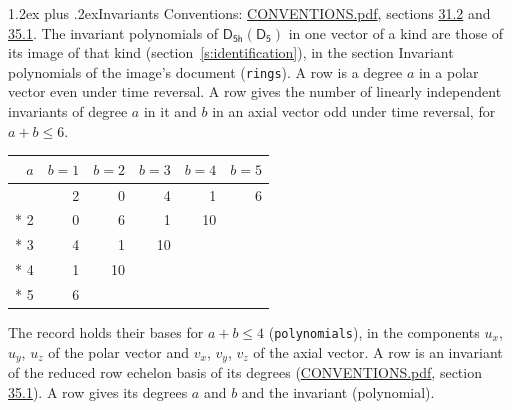 \documentclass[10pt,a4paper]{article}
\makeatletter
\renewcommand\section{\@startsection{section}{1}{\z@}{-3ex plus -1ex minus -.2ex}%
  {1.2ex plus .2ex}{\normalfont\large\sffamily\bfseries\color{parttitle}}}
\numberwithin{equation}{section}
\newcommand{\grp}[1]{\mathsf{#1}}
\makeatother
\begin{document}
\section{Invariants}\label{s:invariants}
Conventions: \href{../../CONVENTIONS.pdf}{CONVENTIONS.pdf}, sections \href{../../CONVENTIONS.pdf\#conv.31.2}{31.2} and \href{../../CONVENTIONS.pdf\#conv.35.1}{35.1}.
The invariant polynomials of $\grp{D_{5h}}(\grp{D_{5}})$ in one vector of a kind are those of its image of that kind (section~\ref{s:identification}), in the section Invariant polynomials of the image's document (\texttt{rings}).
\leavevmode\label{n:index.degree.polar}\label{n:index.degree.axial}A row is a degree $a$ in a polar vector even under time reversal. A row gives the number of linearly independent invariants of degree $a$ in it and $b$ in an axial vector odd under time reversal, for $a + b \le 6$.
{\small\begin{longtable}{@{}rrrrrr@{}}\toprule
$a$ & $b = 1$ & $b = 2$ & $b = 3$ & $b = 4$ & $b = 5$\\\midrule\endhead
\bottomrule\endfoot\endlastfoot
1 & 2 & 0 & 4 & 1 & 6\\*
2 & 0 & 6 & 1 & 10 & \\*
3 & 4 & 1 & 10 &  & \\*
4 & 1 & 10 &  &  & \\*
5 & 6 &  &  &  & \\
\bottomrule\end{longtable}}
\leavevmode\label{n:local.component.polar}\label{n:local.component.axial}The record holds their bases for $a + b \le 4$ (\texttt{polynomials}), in the components $u_{x}$, $u_{y}$, $u_{z}$ of the polar vector and $v_{x}$, $v_{y}$, $v_{z}$ of the axial vector. \label{n:head.polynomial}A row is an invariant of the reduced row echelon basis of its degrees (\href{../../CONVENTIONS.pdf}{CONVENTIONS.pdf}, section \href{../../CONVENTIONS.pdf\#conv.35.1}{35.1}). A row gives its degrees $a$ and $b$ and the invariant (polynomial).
\end{document}
